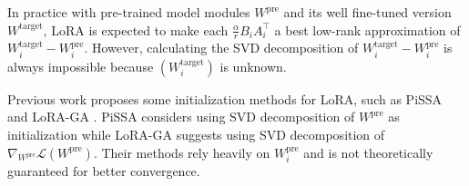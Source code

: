 In practice with pre-trained model modules $W^{\operatorname{pre}}$ and its well fine-tuned version $W^{\operatorname{target}}$, LoRA is expected to make each $\frac{\alpha}{r}B_iA_i^\top$ a best low-rank approximation of $W_i^{\operatorname{target}}-W_i^{\operatorname{pre}}$. However, calculating the SVD decomposition of $W_i^{\operatorname{target}}-W_i^{\operatorname{pre}}$ is always impossible because $(W_i^{\operatorname{target}})$ is unknown. 

Previous work proposes some initialization methods for LoRA, such as PiSSA and LoRA-GA \cite{meng2024pissa,wang2024lora}. PiSSA \cite{meng2024pissa} considers using SVD decomposition of $W^{\operatorname{pre}}$ as initialization while LoRA-GA \cite{wang2024lora} suggests using SVD decomposition of $\nabla_{W^{\operatorname{pre}}}\mathcal{L}(W^{\operatorname{pre}})$. Their methods rely heavily on $W_i^{\operatorname{pre}}$ and is not theoretically guaranteed for better convergence. 











